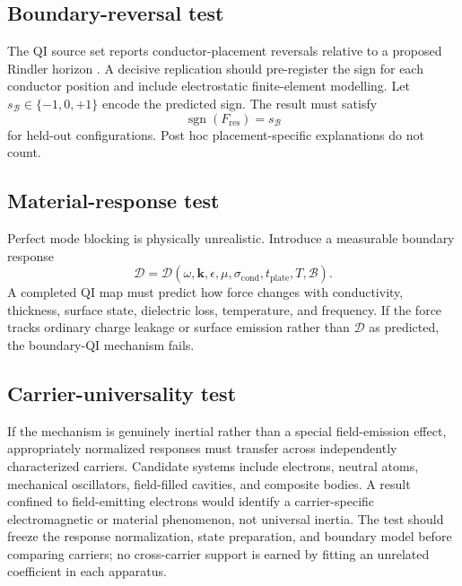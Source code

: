 \documentclass[11pt]{article}
\newcommand{\sgn}{\operatorname{sgn}}
\newcommand{\Bdy}{\mathcal{B}}
\begin{document}
\subsection{Boundary-reversal test}

The QI source set reports conductor-placement reversals relative to a proposed Rindler horizon \cite{BeckerBhatt2018,McCulloch2021Capacitors}. A decisive replication should pre-register the sign for each conductor position and include electrostatic finite-element modelling. Let \(s_{\Bdy}\in\{-1,0,+1\}\) encode the predicted sign. The result must satisfy
\begin{equation}
    \sgn(F_{\mathrm{res}})=s_{\Bdy}
\end{equation}
for held-out configurations. Post hoc placement-specific explanations do not count.

\subsection{Material-response test}

Perfect mode blocking is physically unrealistic. Introduce a measurable boundary response
\begin{equation}
    \mathscr D
    =\mathscr D
    (\omega,\mathbf k,\epsilon,\mu,\sigma_{\mathrm{cond}},t_{\mathrm{plate}},T,\Bdy).
    \label{eq:boundary_response}
\end{equation}
A completed QI map must predict how force changes with conductivity, thickness, surface state, dielectric loss, temperature, and frequency. If the force tracks ordinary charge leakage or surface emission rather than \(\mathscr D\) as predicted, the boundary-QI mechanism fails.

\subsection{Carrier-universality test}

If the mechanism is genuinely inertial rather than a special field-emission effect, appropriately normalized responses must transfer across independently characterized carriers. Candidate systems include electrons, neutral atoms, mechanical oscillators, field-filled cavities, and composite bodies. A result confined to field-emitting electrons would identify a carrier-specific electromagnetic or material phenomenon, not universal inertia. The test should freeze the response normalization, state preparation, and boundary model before comparing carriers; no cross-carrier support is earned by fitting an unrelated coefficient in each apparatus.
\end{document}
